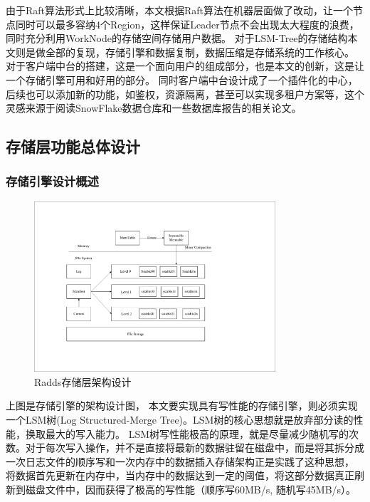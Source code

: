 \begin{enumerate}[fullwidth,itemindent=2em,listparindent=2em]
			由于Raft算法形式上比较清晰，本文根据Raft算法在机器层面做了改动，让一个节点同时可以最多容纳4个Region，这样保证Leader节点不会出现太大程度的浪费，
			同时充分利用WorkNode的存储空间存储用户数据。
			对于LSM-Tree的存储结构本文则是做全部的复现，存储引擎和数据复制，数据压缩是存储系统的工作核心。
			对于客户端中台的搭建，这是一个面向用户的组成部分，也是本文的创新，这是让一个存储引擎可用和好用的部分。
			同时客户端中台设计成了一个插件化的中心，后续也可以添加新的功能，如鉴权，资源隔离，甚至可以实现多租户方案等，这个灵感来源于阅读SnowFlake数据仓库和一些数据库报告的相关论文。
	
		\end{enumerate}
		

		  
	\subsection{存储层功能总体设计}
			



		\subsubsection{存储引擎设计概述}

		\begin{figure}[H]
			\centering
			\includegraphics[width=0.80\textwidth]{pdf/leveldb_arch.pdf}
			\caption{Radds存储层架构设计}
			\label{mobile_overall_design}
		\end{figure}

		上图是存储引擎的架构设计图，
		本文要实现具有写性能的存储引擎，则必须实现一个LSM树(Log Structured-Merge Tree)。LSM树的核心思想就是放弃部分读的性能，换取最大的写入能力。
		LSM树写性能极高的原理，就是尽量减少随机写的次数。对于每次写入操作，并不是直接将最新的数据驻留在磁盘中，而是将其拆分成
		{一次日志文件的顺序写}和{一次内存中的数据插入}存储架构正是实践了这种思想，
		将数据首先更新在内存中，当内存中的数据达到一定的阈值，将这部分数据真正刷新到磁盘文件中，因而获得了极高的写性能（顺序写60MB/s, 随机写45MB/s）。

